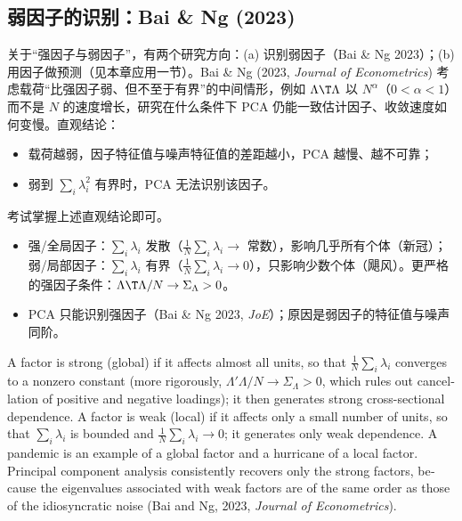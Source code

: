 \subsection{弱因子的识别：Bai \& Ng (2023)}

关于“强因子与弱因子”，有两个研究方向：(a) 识别弱因子（Bai \& Ng 2023）；(b) 用因子做预测（见本章应用一节）。Bai \& Ng (2023, \emph{Journal of Econometrics}) 考虑载荷“比强因子弱、但不至于有界”的中间情形，例如 $\Lambda\T\Lambda$ 以 $N^\alpha$（$0<\alpha<1$）而不是 $N$ 的速度增长，研究在什么条件下 PCA 仍能一致估计因子、收敛速度如何变慢。直观结论：
\begin{itemize}
\item 载荷越弱，因子特征值与噪声特征值的差距越小，PCA 越慢、越不可靠；
\item 弱到 $\sum_i\lambda_i^2$ 有界时，PCA 无法识别该因子。
\end{itemize}
考试掌握上述直观结论即可。

\begin{keypt}[强/弱因子的必记结论]
\begin{itemize}
\item 强/全局因子：$\sum_i\lambda_i$ 发散（$\frac1N\sum_i\lambda_i\to$ 常数），影响几乎所有个体（新冠）；弱/局部因子：$\sum_i\lambda_i$ 有界（$\frac1N\sum_i\lambda_i\to0$），只影响少数个体（飓风）。更严格的强因子条件：$\Lambda\T\Lambda/N\to\Sigma_\Lambda>0$。
\item PCA 只能识别强因子（Bai \& Ng 2023, \emph{JoE}）；原因是弱因子的特征值与噪声同阶。
\end{itemize}
\end{keypt}

\begin{english}
A factor is strong (global) if it affects almost all units, so that $\frac1N\sum_i\lambda_i$ converges to a nonzero constant (more rigorously, $\Lambda'\Lambda/N\to\Sigma_\Lambda>0$, which rules out cancellation of positive and negative loadings); it then generates strong cross-sectional dependence. A factor is weak (local) if it affects only a small number of units, so that $\sum_i\lambda_i$ is bounded and $\frac1N\sum_i\lambda_i\to0$; it generates only weak dependence. A pandemic is an example of a global factor and a hurricane of a local factor. Principal component analysis consistently recovers only the strong factors, because the eigenvalues associated with weak factors are of the same order as those of the idiosyncratic noise (Bai and Ng, 2023, \emph{Journal of Econometrics}).
\end{english}

